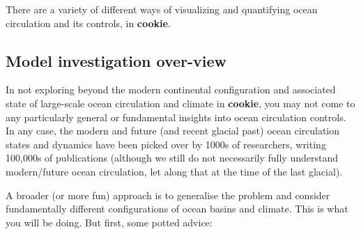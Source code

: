 
There are a variety of different ways of visualizing and quantifying ocean circulation and its controls, in \textbf{cookie}.


\subsection{Model investigation over-view}

In not exploring beyond the modern continental configuration and associated state of large-scale ocean circulation and climate in \textbf{cookie}, you may not come to any particularly general or fundamental insights into ocean circulation controls. In any case, the modern and future (and recent glacial past) ocean circulation states and dynamics have been picked over by 1000s of researchers, writing 100,000s of  publications (although we still do not necessarily fully understand modern/future ocean circulation, let along that at the time of the last glacial).

A broader (or more fun) approach is to generalise the problem and consider fundamentally different configurations of ocean basins and climate. This is what you will be doing. But first, some potted advice:

